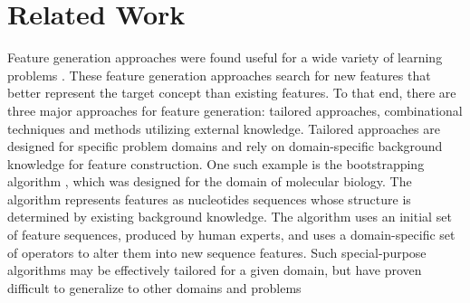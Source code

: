\documentclass[twoside,11pt]{article}
\theoremstyle{definition}
\begin{document}






\section{Related Work}

Feature generation approaches were found useful for a wide variety of learning problems \cite{markovitch2002feature,ragavan1993complex,utgo1991linear}.
These feature generation approaches search for new features that better represent the target concept than existing features. To that end, there are three major approaches for feature generation: tailored approaches, combinational techniques and methods utilizing external knowledge.
Tailored approaches \cite{sutton1991learning,hirsh1994bootstrapping} are designed for specific problem domains and rely on domain-specific background knowledge for feature construction. One such example is the bootstrapping algorithm \cite{hirsh1994bootstrapping}, which was designed for the domain of molecular biology. The algorithm represents features as nucleotides sequences
whose structure is determined by existing background knowledge. The algorithm uses an initial set of feature sequences, produced by human experts, and uses a domain-specific set of operators to alter them into new sequence features. Such special-purpose algorithms may be effectively tailored for a given domain, but have proven difficult to generalize to other domains and problems
\end{document}
